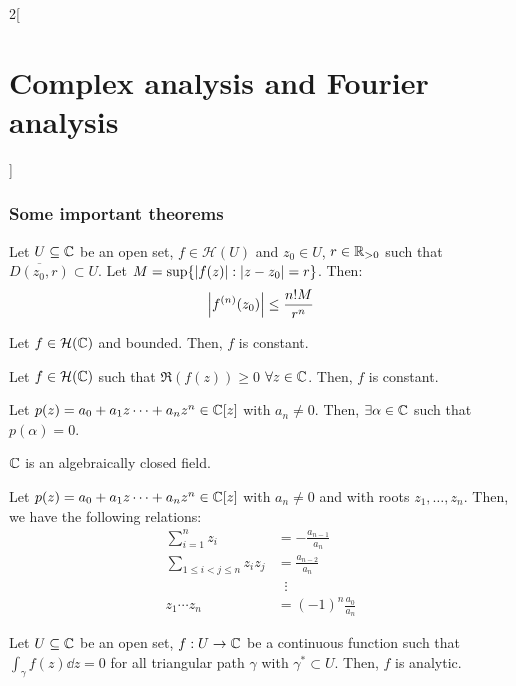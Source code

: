\documentclass[../../../main.tex]{subfiles}
\begin{document}
\begin{multicols}{2}[\section{Complex analysis and Fourier analysis}]
  \subsubsection{Some important theorems}
  \begin{proposition}
    Let $U\subseteq\mathbb{C}$ be an open set, $f\in\mathcal{H}(U)$ and $z_0\in U$, $r\in\mathbb{R}_{>0}$ such that $\overline{D(z_0,r)}\subset U$. Let $M=\sup\{\abs{f(z)}:\abs{z-z_0}=r\}$. Then:
    $$\abs{f^{(n)}(z_0)}\leq\frac{n!M}{r^n}$$
  \end{proposition}
  \begin{theorem}
    Let $f\in\mathcal{H}(\mathbb{C})$ and bounded. Then, $f$ is constant.
  \end{theorem}
  \begin{corollary}
    Let $f\in\mathcal{H}(\mathbb{C})$ such that $\Re(f(z))\geq 0$ $\forall z\in\mathbb{C}$. Then, $f$ is constant.
  \end{corollary}
  \begin{theorem}
    Let $p(z)=a_0+a_1z\cdots+a_nz^n\in\mathbb{C}[z]$ with $a_n\ne 0$. Then, $\exists \alpha\in \mathbb{C}$ such that $p(\alpha)=0$.
  \end{theorem}
  \begin{corollary}
    $\mathbb{C}$ is an algebraically closed field.
  \end{corollary}
  \begin{proposition}
    Let $p(z)=a_0+a_1z\cdots+a_nz^n\in\mathbb{C}[z]$ with $a_n\ne 0$ and with roots $z_1,\ldots,z_n$. Then, we have the following relations:
    \begin{align*}
      \sum_{i=1}^nz_i              & =                    -\frac{a_{n-1}}{a_n}  \\
      \sum_{1\leq i<j\leq n}z_iz_j & =  \frac{a_{n-2}}{a_n}                     \\
                                   & \;\;\vdots                                 \\
      z_1\cdots z_n                & =                  {(-1)}^n\frac{a_0}{a_n}
    \end{align*}
  \end{proposition}
  \begin{theorem}
    Let $U\subseteq\mathbb{C}$ be an open set, $f:U\rightarrow\mathbb{C}$ be a continuous function such that $\displaystyle \int_\gamma f(z)\dd{z}=0$ for all triangular path $\gamma$ with $\gamma^*\subset U$. Then, $f$ is analytic.
  \end{theorem}

\end{multicols}
\end{document}
